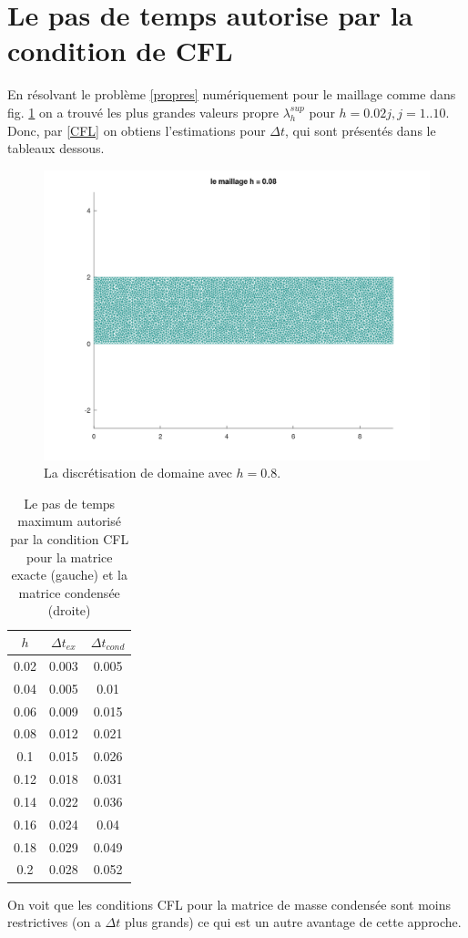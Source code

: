 \documentclass[12pt]{article}
\begin{document}
	\section{Le pas de temps autorise par la condition de CFL}
	En résolvant le problème \eqref{propres} numériquement pour le maillage comme dans fig. \ref{fig:maillage1} on a trouvé les plus grandes valeurs propre $\lambda^{sup}_h$ pour $h = 0.02j, j = 1..10$. Donc, par \eqref{CFL} on obtiens l'estimations pour $\Delta t$, qui sont présentés dans le tableaux dessous.
	\begin{figure}[h]
		\centering
		\includegraphics[height=0.4\linewidth]{images/maillage1}
		\caption{La discrétisation de domaine  avec $h = 0.8$.}
		\label{fig:maillage1}
	\end{figure}
	\begin{table}[H]
		\caption{\label{tab:canonsummary} Le pas de temps maximum autorisé par la condition CFL pour la matrice exacte (gauche) et la matrice condensée (droite) }
		\begin{center}
			\begin{tabular}{|c|c|c|}
				\hline
				$h$ & $\Delta t_{ex}$ & $\Delta t_{cond}$ \\
				\hline
				0.02 & 0.003 &  0.005 \\ 
				0.04 & 0.005 & 0.01 \\
				0.06 & 0.009 & 0.015\\
				0.08 & 0.012 & 0.021\\
				0.1  & 0.015 & 0.026\\
				0.12 & 0.018 & 0.031\\
				0.14 & 0.022 & 0.036\\
				0.16 & 0.024 & 0.04\\
				0.18 & 0.029 & 0.049\\
				0.2  & 0.028 & 0.052\\
				\hline
			\end{tabular}
		\end{center}
	\end{table} 
	On voit que les conditions CFL pour la matrice de masse condensée sont moins restrictives (on a $\Delta t$ plus grands) ce qui est un autre avantage de cette approche.
\end{document}

